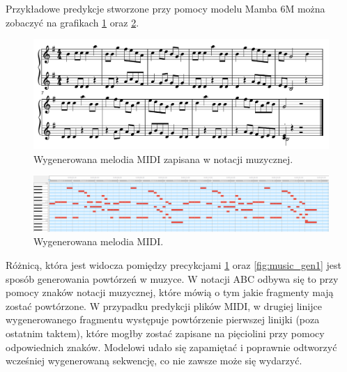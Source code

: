 \documentclass[data-science]{agh-wi} %
\begin{document}
Przykładowe predykcje stworzone przy pomocy modelu Mamba 6M można zobaczyć na grafikach \ref*{fig:music_genMIDI_notes} oraz \ref*{fig:music_genMIDI}.

\begin{figure}[ht!]
    \begin{center}
        \includegraphics[width=0.9\linewidth]{./img/35.pdf}
    \end{center}
    \caption{Wygenerowana melodia MIDI zapisana w notacji muzycznej.}\label{fig:music_genMIDI_notes}
\end{figure}

\begin{figure}[ht!]
    \begin{center}
        \includegraphics[width=0.9\linewidth]{./img/midi_generated.png}
    \end{center}
    \caption{Wygenerowana melodia MIDI.}\label{fig:music_genMIDI}
\end{figure}

Różnicą, która jest widocza pomiędzy precykcjami \ref*{fig:music_genMIDI_notes} oraz \ref*{fig:music_gen1} jest sposób generowania powtórzeń w muzyce. W notacji ABC odbywa się to przy pomocy znaków notacji muzycznej, które mówią o tym jakie fragmenty mają zostać powtórzone. W przypadku predykcji plików MIDI, w drugiej linijce wygenerowanego fragmentu występuje powtórzenie pierwszej linijki (poza ostatnim taktem), które mogłby zostać zapisane na pięciolini przy pomocy odpowiednich znaków. Modelowi udało się zapamiętać i poprawnie odtworzyć wcześniej wygenerowaną sekwencję, co nie zawsze może się wydarzyć.
\end{document}

